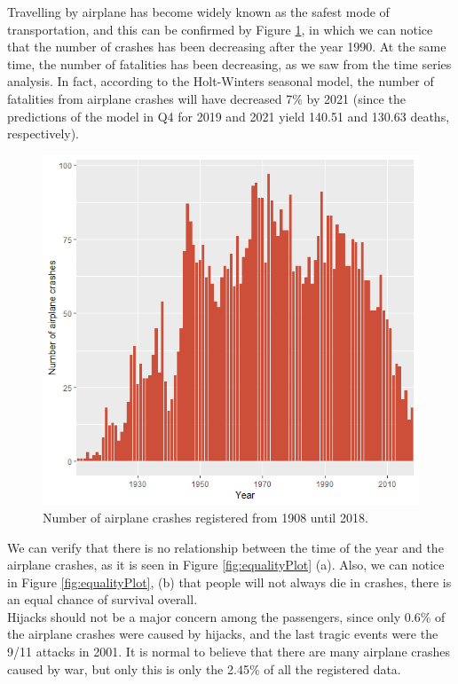 \documentclass[12pt]{article}
\begin{document}
Travelling by airplane has become widely known as the safest mode of transportation, and this can be confirmed by Figure \ref{fig:numCrash}, in which we can notice that the number of crashes has been decreasing after the year 1990. At the same time, the number of fatalities has been decreasing, as we saw from the time series analysis. In fact, according to the Holt-Winters seasonal model, the number of fatalities from airplane crashes will have decreased 7\% by 2021 (since the predictions of the model in Q4 for 2019 and 2021 yield 140.51 and 130.63 deaths, respectively).\\

\begin{figure}[h]
	\centering
	\includegraphics[width=0.8\linewidth]{numCrash}
	\caption{Number of airplane crashes registered from 1908 until 2018.}
	\label{fig:numCrash}
\end{figure}

We can verify that there is no relationship between the time of the year and the airplane crashes, as it is seen in Figure \ref{fig:equalityPlot} (a). Also, we can notice in Figure \ref{fig:equalityPlot}, (b) that people will not always die in crashes, there is an equal chance of survival overall. \\

Hijacks should not be a major concern among the passengers, since only 0.6\% of the airplane crashes were caused by hijacks, and the last tragic events were the 9/11 attacks in 2001. It is normal to believe that there are many airplane crashes caused by war, but only this is only the 2.45\% of all the registered data. 
\end{document}
